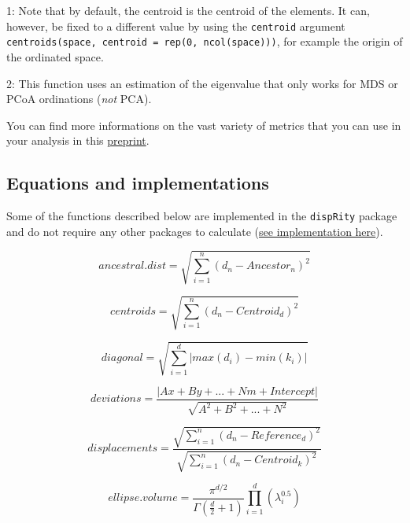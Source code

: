 \documentclass[]{book}
\begin{document}
1: Note that by default, the centroid is the centroid of the elements.
It can, however, be fixed to a different value by using the \texttt{centroid} argument \texttt{centroids(space,\ centroid\ =\ rep(0,\ ncol(space)))}, for example the origin of the ordinated space.

2: This function uses an estimation of the eigenvalue that only works for MDS or PCoA ordinations (\emph{not} PCA).

You can find more informations on the vast variety of metrics that you can use in your analysis in this \href{https://www.biorxiv.org/content/10.1101/801571v1}{preprint}.

\hypertarget{equations-and-implementations}{%
\subsection{Equations and implementations}\label{equations-and-implementations}}

Some of the functions described below are implemented in the \texttt{dispRity} package and do not require any other packages to calculate (\href{https://github.com/TGuillerme/dispRity/blob/master/R/dispRity.metric.R}{see implementation here}).

\begin{equation}
    ancestral.dist = \sqrt{\sum_{i=1}^{n}{({d}_{n}-Ancestor_{n})^2}}
\end{equation}

\begin{equation}
    centroids = \sqrt{\sum_{i=1}^{n}{({d}_{n}-Centroid_{d})^2}}
\end{equation}

\begin{equation}
    diagonal = \sqrt{\sum_{i=1}^{d}|max(d_i) - min(k_i)|}
\end{equation}

\begin{equation}
    deviations = \frac{|Ax + By + ... + Nm + Intercept|}{\sqrt{A^2 + B^2 + ... + N^2}}
\end{equation}

\begin{equation}
    displacements = \frac{\sqrt{\sum_{i=1}^{n}{({d}_{n}-Reference_{d})^2}}}{\sqrt{\sum_{i=1}^{n}{({d}_{n}-Centroid_{k})^2}}}
\end{equation}

\begin{equation}
    ellipse.volume = \frac{\pi^{d/2}}{\Gamma(\frac{d}{2}+1)}\displaystyle\prod_{i=1}^{d} (\lambda_{i}^{0.5})
\end{equation}
\end{document}
